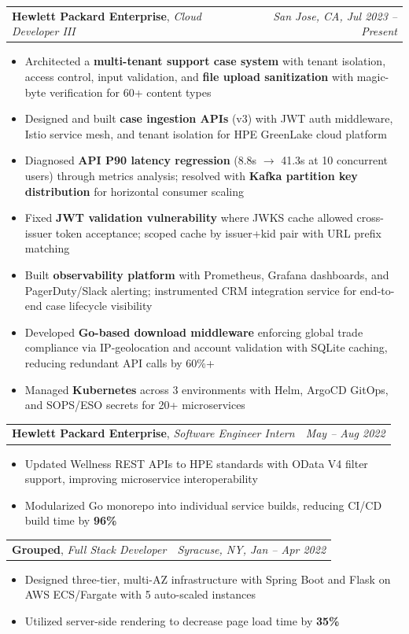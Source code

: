 \documentclass[letterpaper,10pt]{article}
\makeatletter
\newcommand{\resumeSubheading}[4]{
  \vspace{8pt}\noindent
  \begin{tabularx}{\textwidth}{@{}X r@{}}
    \textbf{#1}, \textit{#2} & \textit{\small #3, #4}
  \end{tabularx}
  \vspace{-8pt}
}
\newcommand{\resumeSubheadingSimple}[3]{
  \vspace{8pt}\noindent
  \begin{tabularx}{\textwidth}{@{}X r@{}}
    \textbf{#1}, \textit{#2} & \textit{\small #3} \\
  \end{tabularx}
  \vspace{-8pt}
}
\makeatother
\begin{document}
\resumeSubheading
  {Hewlett Packard Enterprise}{Cloud Developer III}{San Jose, CA}{Jul 2023 -- Present}
\begin{itemize}[leftmargin=0.15in, nosep, itemsep=3pt, topsep=0pt]
  \item Architected a \textbf{multi-tenant support case system} with tenant isolation, access control, input validation, and \textbf{file upload sanitization} with magic-byte verification for 60+ content types
  \item Designed and built \textbf{case ingestion APIs} (v3) with JWT auth middleware, Istio service mesh, and tenant isolation for HPE GreenLake cloud platform
  \item Diagnosed \textbf{API P90 latency regression} (8.8s $\rightarrow$ 41.3s at 10 concurrent users) through metrics analysis; resolved with \textbf{Kafka partition key distribution} for horizontal consumer scaling
  \item Fixed \textbf{JWT validation vulnerability} where JWKS cache allowed cross-issuer token acceptance; scoped cache by issuer+kid pair with URL prefix matching
  \item Built \textbf{observability platform} with Prometheus, Grafana dashboards, and PagerDuty/Slack alerting; instrumented CRM integration service for end-to-end case lifecycle visibility
  \item Developed \textbf{Go-based download middleware} enforcing global trade compliance via IP-geolocation and account validation with SQLite caching, reducing redundant API calls by 60\%+
  \item Managed \textbf{Kubernetes} across 3 environments with Helm, ArgoCD GitOps, and SOPS/ESO secrets for 20+ microservices
\end{itemize}

\resumeSubheadingSimple
  {Hewlett Packard Enterprise}{Software Engineer Intern}{May -- Aug 2022}
\begin{itemize}[leftmargin=0.15in, nosep, itemsep=3pt, topsep=0pt]
  \item Updated Wellness REST APIs to HPE standards with OData V4 filter support, improving microservice interoperability
  \item Modularized Go monorepo into individual service builds, reducing CI/CD build time by \textbf{96\%}
\end{itemize}

\resumeSubheading
  {Grouped}{Full Stack Developer}{Syracuse, NY}{Jan -- Apr 2022}
\begin{itemize}[leftmargin=0.15in, nosep, itemsep=3pt, topsep=0pt]
  \item Designed three-tier, multi-AZ infrastructure with Spring Boot and Flask on AWS ECS/Fargate with 5 auto-scaled instances
  \item Utilized server-side rendering to decrease page load time by \textbf{35\%}
\end{itemize}
\end{document}
